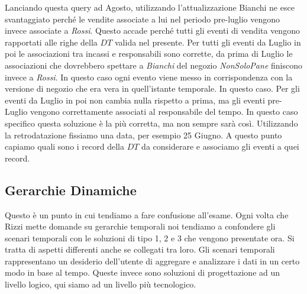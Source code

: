 \noindent Lanciando questa query ad Agosto, utilizzando l'attualizzazione Bianchi ne esce svantaggiato perché le vendite associate a lui nel periodo pre-luglio vengono invece associate a \textit{Rossi}. Questo accade perché tutti gli eventi di vendita vengono rapportati alle righe della $DT$ valida nel presente. Per tutti gli eventi da Luglio in poi le associazioni tra incassi e responsabili sono corrette, da prima di Luglio le associazioni che dovrebbero spettare a \textit{Bianchi} del negozio \textit{NonSoloPane} finiscono invece a \textit{Rossi}.
\noindent In questo caso ogni evento viene messo in corrispondenza con la versione di negozio che era vera in quell'istante temporale. In questo caso. Per gli eventi da Luglio in poi non cambia nulla rispetto a prima, ma gli eventi pre-Luglio vengono correttamente associati al responsabile del tempo. In questo caso specifico questa soluzione è la più corretta, ma non sempre sarà così.
\noindent Utilizzando la retrodatazione fissiamo una data, per esempio 25 Giugno. A questo punto capiamo quali sono i record della $DT$ da considerare e associamo gli eventi a quei record.
\subsection{Gerarchie Dinamiche}
\begin{warn}
	Questo è un punto in cui tendiamo a fare confusione all'esame. Ogni volta che Rizzi mette domande su gerarchie temporali noi tendiamo a confondere gli scenari temporali con le soluzioni di tipo 1, 2 e 3 che vengono presentate ora. Si tratta di aspetti differenti anche se collegati tra loro. Gli scenari temporali rappresentano un desiderio dell'utente di aggregare e analizzare i dati in un certo modo in base al tempo. Queste invece sono soluzioni di progettazione ad un livello logico, qui siamo ad un livello più tecnologico.
\end{warn}

